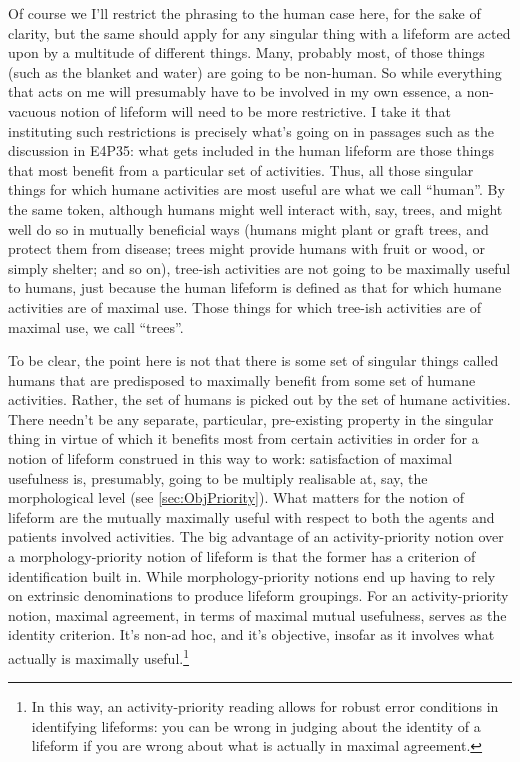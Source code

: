 \documentclass{article}
\newcommand{\dash}{\unskip{—}}
\begin{document}
Of course we \dash I'll restrict the phrasing to the human case here, for the sake of clarity, but the same should apply for any singular thing with a lifeform \dash are acted upon by a multitude of different things. Many, probably most, of those things (such as the blanket and water) are going to be non-human. So while everything that acts on me will presumably have to be involved in my own essence, a non-vacuous notion of lifeform will need to be more restrictive. I take it that instituting such restrictions is precisely what's going on in passages such as the discussion in E4P35: what gets included in the human lifeform are those things that most benefit from a particular set of activities. Thus, all those singular things for which humane activities are most useful are what we call \enquote{human}. By the same token, although humans might well interact with, say, trees, and might well do so in mutually beneficial ways (humans might plant or graft trees, and protect them from disease; trees might provide humans with fruit or wood, or simply shelter; and so on), tree-ish activities are not going to be maximally useful to humans, just because the human lifeform is defined as that for which humane activities are of maximal use. Those things for which tree-ish activities are of maximal use, we call \enquote{trees}.

To be clear, the point here is not that there is some set of singular things called humans that are predisposed to maximally benefit from some set of humane activities. Rather, the set of humans is picked out by the set of humane activities. There needn't be any separate, particular, pre-existing property in the singular thing in virtue of which it benefits most from certain activities in order for a notion of lifeform construed in this way to work: satisfaction of maximal usefulness is, presumably, going to be multiply realisable at, say, the morphological level (see \cref{sec:ObjPriority}). What matters for the notion of lifeform are the mutually maximally useful \dash with respect to both the agents and patients involved \dash activities. The big advantage of an activity-priority notion over a morphology-priority notion of lifeform is that the former has a criterion of identification built in. While morphology-priority notions end up having to rely on extrinsic denominations to produce lifeform groupings. For an activity-priority notion, maximal agreement, in terms of maximal mutual usefulness, serves as the identity criterion. It's non-ad hoc, and it's objective, insofar as it involves what actually is maximally useful.\footnote{In this way, an activity-priority reading allows for robust error conditions in identifying lifeforms: you can be wrong in judging about the identity of a lifeform if you are wrong about what is actually in maximal agreement.}
\end{document}
